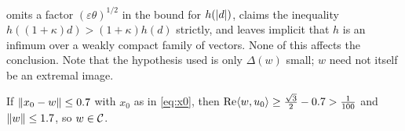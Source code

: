 \begin{remark}
\paper{} omits a factor $(\varepsilon\theta)^{1/2}$ in the bound for $h(\lvert d\rvert)$, claims the
inequality $h((1+\kappa)d)>(1+\kappa)h(d)$ strictly, and leaves implicit that $h$ is an infimum
over a weakly compact family of vectors. None of this affects the conclusion. Note that the
hypothesis used is only $\Delta(w)$ small; $w$ need not itself be an extremal image.
\end{remark}

\begin{remark}\label{rem:cone}
If $\lVert x_0-w\rVert\le0.7$ with $x_0$ as in \eqref{eq:x0}, then
$\operatorname{Re}\langle w,u_0\rangle\ge\frac{\sqrt3}2-0.7>\frac1{100}$ and $\lVert w\rVert\le1.7$, so $w\in\mathcal{C}$.
\end{remark}
